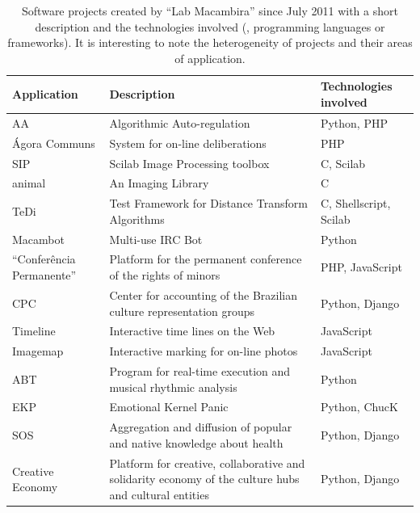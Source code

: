 \documentclass[letterpaper]{article}
\begin{document}
\begin{table}
    \caption{Software projects created by ``Lab Macambira'' since July
      2011 with a short description and the technologies involved (\eg,
      programming languages or frameworks). It is
      interesting to note the heterogeneity of projects and their areas
      of application.}
    \begin{tabular}{|l|p{5cm}|l|}
        \hline
        Application & Description & Technologies involved \\ 
        \hline \hline
        AA            & Algorithmic Auto-regulation      & Python, PHP \\
        \hline
        \'{A}gora Communs & System for on-line deliberations & PHP \\
        \hline
        SIP           & Scilab Image Processing toolbox & C, Scilab \\
        \hline
        animal        & An Imaging Library              & C \\
        \hline
        TeDi          & Test Framework for Distance Transform
        Algorithms & C, Shellscript, Scilab \\
        \hline
        Macambot      & Multi-use IRC Bot               & Python \\
        \hline
        ``Confer\^{e}ncia Permanente'' & Platform for the permanent
        conference of the rights of minors & PHP, JavaScript \\
        \hline
        CPC           & Center for accounting of the Brazilian culture
        representation groups & Python, Django \\
        \hline
        Timeline      & Interactive time lines on the Web & JavaScript
        \\
        \hline
        Imagemap      & Interactive marking for on-line photos &
        JavaScript \\
        \hline
        ABT           & Program for real-time execution and musical
        rhythmic analysis & Python \\
        \hline
        EKP           & Emotional Kernel Panic & Python, ChucK \\
        \hline
        SOS           & Aggregation and diffusion of popular and native
        knowledge about health & Python, Django \\
        \hline
        Creative Economy & Platform for creative, collaborative and
        solidarity economy of the culture hubs and cultural entities &
        Python, Django \\

\end{tabular}
\end{table}
\end{document}
